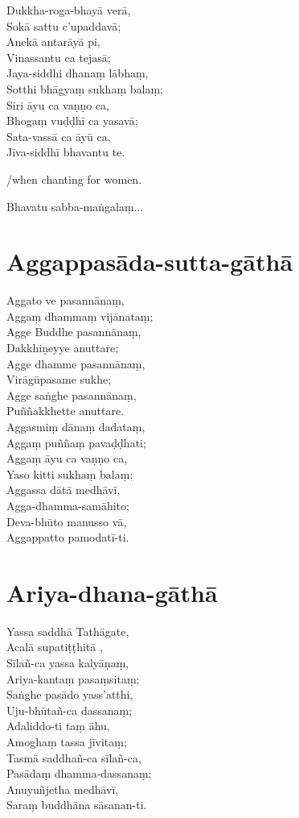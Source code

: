 Dukkha-roga-bhayā verā,\\
Sokā sattu c’upaddavā;\\
Anekā antarāyā pi,\\
Vinassantu ca tejasā;\\
Jaya-siddhi dhanaṃ lābhaṃ,\\
Sotthi bhāgyaṃ sukhaṃ balaṃ;\\
Siri āyu ca vaṇṇo ca,\\
Bhogaṃ vuḍḍhī ca yasavā;\\
Sata-vassā ca āyū ca,\\
Jīva-siddhī bhavantu te.

/when chanting for women.

Bhavatu sabba-maṅgalaṃ...

\chapter{Aggappasāda-sutta-gāthā}

Aggato ve pasannānaṃ,\\
Aggaṃ dhammaṃ vijānataṃ;\\
Agge Buddhe pasannānaṃ,\\
Dakkhiṇeyye anuttare;\\
Agge dhamme pasannānaṃ,\\
Virāgūpasame sukhe;\\
Agge saṅghe pasannānaṃ,\\
Puññakkhette anuttare.\\
Aggasmiṃ dānaṃ dadataṃ,\\
Aggaṃ puññaṃ pavaḍḍhati;\\
Aggaṃ āyu ca vaṇṇo ca,\\
Yaso kitti sukhaṃ balaṃ;\\
Aggassa dātā medhāvī,\\
Agga-dhamma-samāhito;\\
Deva-bhūto manusso vā,\\
Aggappatto pamodatī-ti.

\chapter{Ariya-dhana-gāthā}

Yassa saddhā Tathāgate,\\
Acalā supatiṭṭhitā ,\\
Sīlañ-ca yassa kalyāṇaṃ,\\
Ariya-kantaṃ pasaṃsitaṃ;\\
Saṅghe pasādo yass’atthi,\\
Uju-bhūtañ-ca dassanaṃ;\\
Adaliddo-ti taṃ āhu,\\
Amoghaṃ tassa jīvitaṃ;\\
Tasmā saddhañ-ca sīlañ-ca,\\
Pasādaṃ dhamma-dassanaṃ;\\
Anuyuñjetha medhāvī,\\
Saraṃ buddhāna sāsanan-ti.

